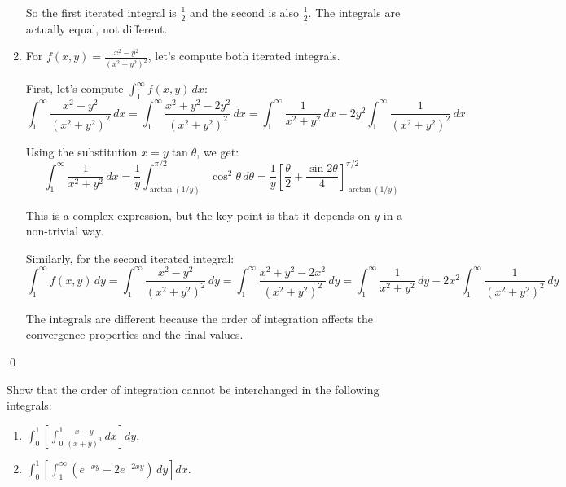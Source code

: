 \begin{enumerate}[label=(\alph*)]
    So the first iterated integral is $\frac{1}{2}$ and the second is also $\frac{1}{2}$. The integrals are actually equal, not different.
    
    \item For $f(x, y) = \frac{x^2 - y^2}{(x^2 + y^2)^2}$, let's compute both iterated integrals.
    
    First, let's compute $\int_{1}^{\infty} f(x, y) \, dx$:
    \[\int_{1}^{\infty} \frac{x^2 - y^2}{(x^2 + y^2)^2} \, dx = \int_{1}^{\infty} \frac{x^2 + y^2 - 2y^2}{(x^2 + y^2)^2} \, dx = \int_{1}^{\infty} \frac{1}{x^2 + y^2} \, dx - 2y^2 \int_{1}^{\infty} \frac{1}{(x^2 + y^2)^2} \, dx\]
    
    Using the substitution $x = y \tan \theta$, we get:
    \[\int_{1}^{\infty} \frac{1}{x^2 + y^2} \, dx = \frac{1}{y} \int_{\arctan(1/y)}^{\pi/2} \cos^2 \theta \, d\theta = \frac{1}{y} \left[\frac{\theta}{2} + \frac{\sin 2\theta}{4}\right]_{\arctan(1/y)}^{\pi/2}\]
    
    This is a complex expression, but the key point is that it depends on $y$ in a non-trivial way.
    
    Similarly, for the second iterated integral:
    \[\int_{1}^{\infty} f(x, y) \, dy = \int_{1}^{\infty} \frac{x^2 - y^2}{(x^2 + y^2)^2} \, dy = \int_{1}^{\infty} \frac{x^2 + y^2 - 2x^2}{(x^2 + y^2)^2} \, dy = \int_{1}^{\infty} \frac{1}{x^2 + y^2} \, dy - 2x^2 \int_{1}^{\infty} \frac{1}{(x^2 + y^2)^2} \, dy\]
    
    The integrals are different because the order of integration affects the convergence properties and the final values.
\end{enumerate}\qed


\begin{problembox}
Show that the order of integration cannot be interchanged in the following integrals:
\begin{enumerate}[label=(\alph*)]
    \item $\int_{0}^{1} \left[ \int_{0}^{1} \frac{x - y}{(x + y)^{3}} \, dx \right] dy$,
    \item $\int_{0}^{1} \left[ \int_{1}^{\infty} (e^{-xy} - 2e^{-2xy}) \, dy \right] dx.$
\end{enumerate}
\end{problembox}

